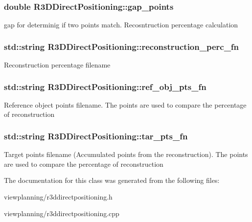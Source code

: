 \subsubsection[{\texorpdfstring{gap\+\_\+points}{gap_points}}]{\setlength{\rightskip}{0pt plus 5cm}double R3\+D\+Direct\+Positioning\+::gap\+\_\+points}\hypertarget{classR3DDirectPositioning_a1649f58b4c24dca72b16e8e76e53180a}{}\label{classR3DDirectPositioning_a1649f58b4c24dca72b16e8e76e53180a}
gap for determinig if two points match. Recosntruction percentage calculation 
\subsubsection[{\texorpdfstring{reconstruction\+\_\+perc\+\_\+fn}{reconstruction_perc_fn}}]{\setlength{\rightskip}{0pt plus 5cm}std\+::string R3\+D\+Direct\+Positioning\+::reconstruction\+\_\+perc\+\_\+fn}\hypertarget{classR3DDirectPositioning_a5b0188ce75a41eb131151b87d5838222}{}\label{classR3DDirectPositioning_a5b0188ce75a41eb131151b87d5838222}
Reconstruction percentage filename 
\subsubsection[{\texorpdfstring{ref\+\_\+obj\+\_\+pts\+\_\+fn}{ref_obj_pts_fn}}]{\setlength{\rightskip}{0pt plus 5cm}std\+::string R3\+D\+Direct\+Positioning\+::ref\+\_\+obj\+\_\+pts\+\_\+fn}\hypertarget{classR3DDirectPositioning_a328fd507b2d871268e8d3534e0cc94af}{}\label{classR3DDirectPositioning_a328fd507b2d871268e8d3534e0cc94af}
Reference object points filename. The points are used to compare the percentage of reconstruction 
\subsubsection[{\texorpdfstring{tar\+\_\+pts\+\_\+fn}{tar_pts_fn}}]{\setlength{\rightskip}{0pt plus 5cm}std\+::string R3\+D\+Direct\+Positioning\+::tar\+\_\+pts\+\_\+fn}\hypertarget{classR3DDirectPositioning_a156083c077bff5fa575d1f436108d85d}{}\label{classR3DDirectPositioning_a156083c077bff5fa575d1f436108d85d}
Target points filename (Accumulated points from the reconstruction). The points are used to compare the percentage of reconstruction 

The documentation for this class was generated from the following files\+:\begin{DoxyCompactItemize}
\item 
viewplanning/r3ddirectpositioning.\+h\item 
viewplanning/r3ddirectpositioning.\+cpp\end{DoxyCompactItemize}
